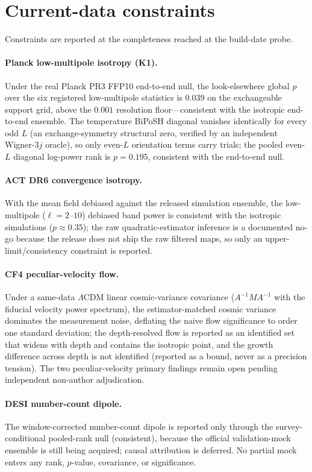 \documentclass[11pt]{article}
\begin{document}
\section{Current-data constraints}
\label{sec:data}
Constraints are reported at the completeness reached at the build-date probe.

\paragraph{Planck low-multipole isotropy (K1).}
Under the real Planck PR3 FFP10 end-to-end null, the look-elsewhere global
$p$ over the six registered low-multipole statistics is $0.039$ on the
exchangeable support grid, above the $0.001$ resolution floor---consistent
with the isotropic end-to-end ensemble. The temperature BiPoSH diagonal vanishes
identically for every odd $L$ (an exchange-symmetry structural zero, verified by
an independent Wigner-$3j$ oracle), so only even-$L$ orientation terms carry
trials; the pooled even-$L$ diagonal log-power rank is $p=0.195$,
consistent with the end-to-end null.

\paragraph{ACT DR6 convergence isotropy.}
With the mean field debiased against the released simulation ensemble, the
low-multipole ($\ell=2$--$10$) debiased band power is consistent with the
isotropic simulations ($p\approx0.35$); the raw quadratic-estimator inference
is a documented no-go because the release does not ship the raw filtered maps, so
only an upper-limit/consistency constraint is reported.

\paragraph{CF4 peculiar-velocity flow.}
Under a same-data $\Lambda$CDM linear cosmic-variance covariance
($A^{-1}MA^{-1}$ with the fiducial velocity power spectrum), the estimator-matched
cosmic variance dominates the measurement noise, deflating the naive flow
significance to order one standard deviation; the depth-resolved flow is reported
as an identified set that widens with depth and contains the isotropic point, and
the growth difference across depth is not identified (reported as a bound, never
as a precision tension). The two peculiar-velocity primary findings remain open
pending independent non-author adjudication.

\paragraph{DESI number-count dipole.}
The window-corrected number-count dipole is reported only through the
survey-conditional pooled-rank null (consistent), because the official
validation-mock ensemble is still being acquired; causal attribution is deferred.
No partial mock enters any rank, $p$-value, covariance, or significance.
\end{document}
